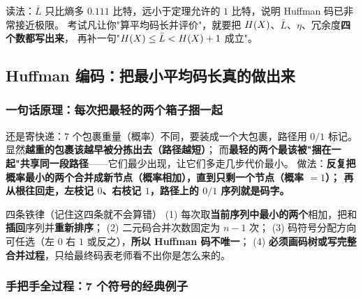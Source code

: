 读法：$\bar L$ 只比熵多 $0.111$ 比特，远小于定理允许的 $1$ 比特，说明 Huffman 码已非常接近极限。
考试凡让你"算平均码长并评价"，就要把 $H\!\left(X\right)$、$\bar L$、$\eta$、冗余度\textbf{四个数都写出来}，
再补一句"$H\!\left(X\right)\le\bar L<H\!\left(X\right)+1$ 成立"。

\subsection{Huffman 编码：把最小平均码长真的做出来}

\subsubsection{一句话原理：每次把最轻的两个箱子捆一起}
还是寄快递：$7$ 个包裹重量（概率）不同，要装成一个大包裹，路径用 $0/1$ 标记。
显然\textbf{越重的包裹该越早被分拣出去（路径越短）}；
而\textbf{最轻的两个最该被"捆在一起"共享同一段路径}——它们最少出现，让它们多走几步代价最小。
做法：\textbf{反复把概率最小的两个合并成新节点（概率相加），直到只剩一个节点（概率 $=1$）；
再从根往回走，左枝记 $0$、右枝记 $1$，路径上的 $0/1$ 序列就是码字。}

\begin{idea}{四条铁律（记住这四条就不会算错）}
(1) 每次取\textbf{当前序列中最小的两个}相加，把和\textbf{插回}序列并\textbf{重新排序}；
(2) 二元码合并次数固定为 $n-1$ 次；
(3) 码符号分配方向可任选（左 $0$ 右 $1$ 或反之），\textbf{所以 Huffman 码不唯一}；
(4) \textbf{必须画码树或写完整合并过程}，只给最终码表老师看不出你是怎么来的。
\end{idea}

\subsubsection{手把手全过程：7 个符号的经典例子}

